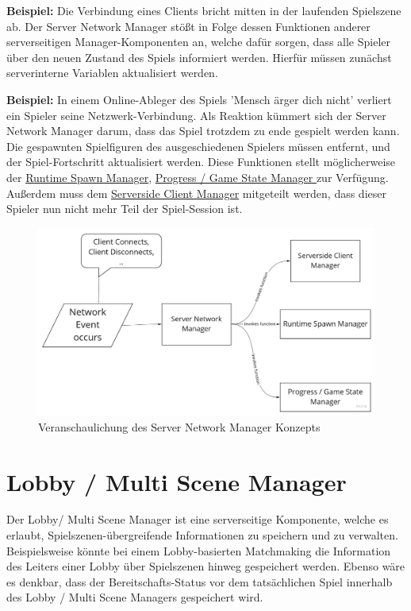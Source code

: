 \textbf{Beispiel:} Die Verbindung eines Clients bricht mitten in der laufenden Spielszene ab. Der Server Network Manager stößt in Folge dessen Funktionen anderer serverseitigen Manager-Komponenten an, welche dafür sorgen, dass alle Spieler über den neuen Zustand des Spiels informiert werden. Hierfür müssen zunächst serverinterne Variablen aktualisiert werden.

\textbf{Beispiel:} In einem Online-Ableger des Spiels 'Mensch ärger dich nicht' verliert ein Spieler seine Netzwerk-Verbindung. Als Reaktion kümmert sich der Server Network Manager darum, dass das Spiel trotzdem zu ende gespielt werden kann. Die gespawnten Spielfiguren des ausgeschiedenen Spielers müssen entfernt, und der Spiel-Fortschritt aktualisiert werden. Diese Funktionen stellt möglicherweise der \hyperref[spawn_manager]{Runtime Spawn Manager}, \hyperref[progress_manager]{Progress / Game State Manager } zur Verfügung.
Außerdem muss dem \hyperref[serverside_client_manager]{Serverside Client Manager} mitgeteilt werden, dass dieser Spieler nun nicht mehr Teil der Spiel-Session ist.


\begin{figure}
	\centering
	\includegraphics[width=150mm]{images/Server_Network_Manager.jpg}
	\caption[Server Network Manager Diagramm]{Veranschaulichung des Server Network Manager Konzepts}
	\label{pic:Server_Network_Manager}
\end{figure}


\section{Lobby / Multi Scene Manager}

Der Lobby/ Multi Scene Manager ist eine serverseitige Komponente, welche es erlaubt, Spielszenen-übergreifende Informationen zu speichern und zu verwalten. Beispielsweise könnte bei einem Lobby-basierten Matchmaking die Information des Leiters einer Lobby über Spielszenen hinweg gespeichert werden. Ebenso wäre es denkbar, dass der Bereitschafts-Status vor dem tatsächlichen Spiel innerhalb des Lobby / Multi Scene Managers gespeichert wird.


